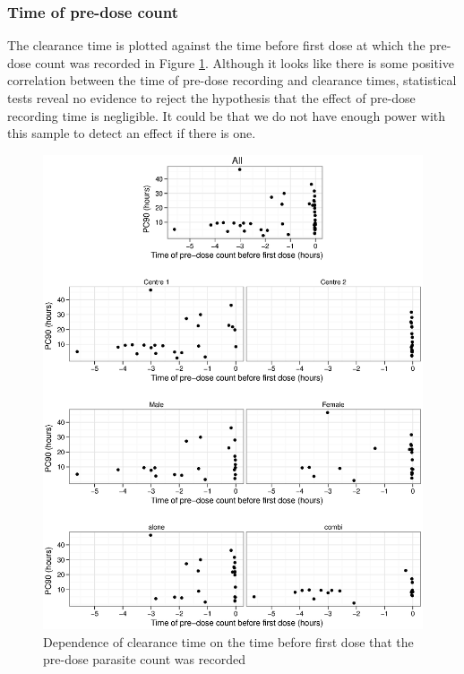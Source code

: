 \subsubsection*{Time of pre-dose count}\label{sec:pretimeancova}
The clearance time is plotted against the time before first dose at which the pre-dose count was recorded in Figure \ref{pretime-ancova}. Although it looks like there is some positive correlation between the time of pre-dose recording and clearance times, statistical tests reveal no evidence to reject the hypothesis that the effect of pre-dose recording time is negligible. It could be that we do not have enough power with this sample to detect an effect if there is one. 
\begin{figure}[p]
\includegraphics[width=150mm]{pretime-ancova.eps} 
\caption{Dependence of clearance time on the time before first dose that the pre-dose parasite count was recorded}
\label{pretime-ancova}
\end{figure}


